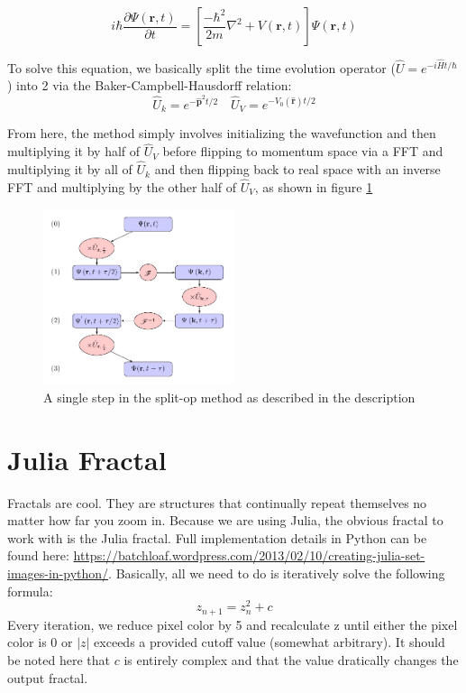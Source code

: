 \documentclass[11pt]{article}
\begin{document}
$$
i \hbar \frac{\partial \Psi(\mathbf{r}, t)}{\partial t} = \left[\frac{-\hbar^2}{2m} \nabla^2 + V(\mathbf{r},t) \right] \Psi(\mathbf{r},t)
$$

To solve this equation, we basically split the time evolution operator ($\hat U = e^{-i \hat H t / \hbar}$) into 2 via the Baker-Campbell-Hausdorff relation:
$$\hat U_k = e^{-\mathbf{\hat p}^2 t / 2} \quad \hat U_V = e^{-V_0(\mathbf{\hat r})t/2}$$

From here, the method simply involves initializing the wavefunction and then multiplying it by half of $\hat U_V$ before flipping to momentum space via a FFT and multiplying it by all of $\hat U_k$ and then flipping back to real space with an inverse FFT and multiplying by the other half of $\hat U_V$, as shown in figure \ref{fig:split-op}

\begin{figure}
\begin{center}
\includegraphics[width = 0.5\textwidth]{split-op.png}
\end{center}
\caption{A single step in the split-op method as described in the description}
\label{fig:split-op}
\end{figure}

\newpage
\section*{Julia Fractal}
Fractals are cool. They are structures that continually repeat themselves no matter how far you zoom in. Because we are using Julia, the obvious fractal to work with is the Julia fractal. Full implementation details in Python can be found here: \url{https://batchloaf.wordpress.com/2013/02/10/creating-julia-set-images-in-python/}. Basically, all we need to do is iteratively solve the following formula:
$$z_{n+1} = z_n^2 + c$$
Every iteration, we reduce pixel color by 5 and recalculate z until either the pixel color is 0 or $|z|$ exceeds a provided cutoff value (somewhat arbitrary). It should be noted here that $c$ is entirely complex and that the value dratically changes the output fractal.
\end{document}
